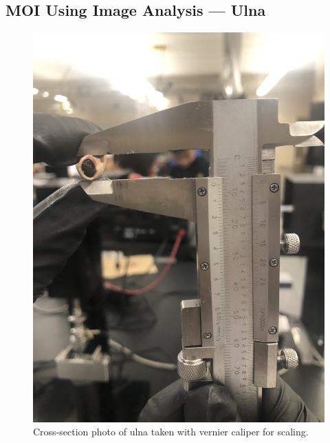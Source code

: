 \documentclass[conference, letterpaper]{IEEEtran}
\begin{document}
        \subsection{MOI Using Image Analysis --- Ulna}\label{apdx_be}
            \begin{figure}[htbp]
                \centerline{\includegraphics[width = 0.75\linewidth]{ulna_full.jpg}}
                \caption{Cross-section photo of ulna taken with vernier caliper for scaling.}\label{ulna_full}
            \end{figure}
\end{document}
